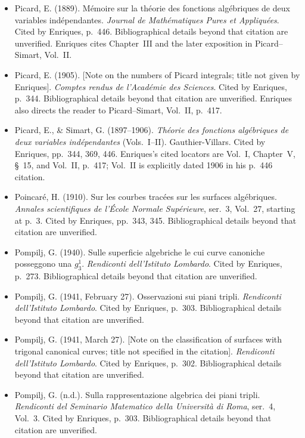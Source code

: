 \begin{sloppypar}
\begin{itemize}
\item Picard, E. (1889). Mémoire sur la théorie des fonctions algébriques de deux variables indépendantes. \emph{Journal de Mathématiques Pures et Appliquées}. Cited by Enriques, p.~446. Bibliographical details beyond that citation are unverified. Enriques cites Chapter~III and the later exposition in Picard--Simart, Vol.~II.

\item Picard, E. (1905). [Note on the numbers of Picard integrals; title not given by Enriques]. \emph{Comptes rendus de l'Académie des Sciences}. Cited by Enriques, p.~344. Bibliographical details beyond that citation are unverified. Enriques also directs the reader to Picard--Simart, Vol.~II, p.~417.

\item Picard, E., \& Simart, G. (1897--1906). \emph{Théorie des fonctions algébriques de deux variables indépendantes} (Vols.~I--II). Gauthier-Villars. Cited by Enriques, pp.~344, 369, 446. Enriques's cited locators are Vol.~I, Chapter~V, \S~15, and Vol.~II, p.~417; Vol.~II is explicitly dated 1906 in his p.~446 citation.

\item Poincaré, H. (1910). Sur les courbes tracées sur les surfaces algébriques. \emph{Annales scientifiques de l'École Normale Supérieure}, ser.~3, Vol.~27, starting at p.~3. Cited by Enriques, pp.~343, 345. Bibliographical details beyond that citation are unverified.

\item Pompilj, G. (1940). Sulle superficie algebriche le cui curve canoniche posseggono una $g^1_3$. \emph{Rendiconti dell'Istituto Lombardo}. Cited by Enriques, p.~273. Bibliographical details beyond that citation are unverified.

\item Pompilj, G. (1941, February 27). Osservazioni sui piani tripli. \emph{Rendiconti dell'Istituto Lombardo}. Cited by Enriques, p.~303. Bibliographical details beyond that citation are unverified.

\item Pompilj, G. (1941, March 27). [Note on the classification of surfaces with trigonal canonical curves; title not specified in the citation]. \emph{Rendiconti dell'Istituto Lombardo}. Cited by Enriques, p.~302. Bibliographical details beyond that citation are unverified.

\item Pompilj, G. (n.d.). Sulla rappresentazione algebrica dei piani tripli. \emph{Rendiconti del Seminario Matematico della Università di Roma}, ser.~4, Vol.~3. Cited by Enriques, p.~303. Bibliographical details beyond that citation are unverified.


\end{itemize}
\end{sloppypar}

